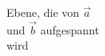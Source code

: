 \documentclass[preview]{standalone}
\begin{document}
\begin{center}
Ebene, die von $\vec{a}$\\und $\vec{b}$ aufgespannt\\wird
\end{center}
\end{document}
